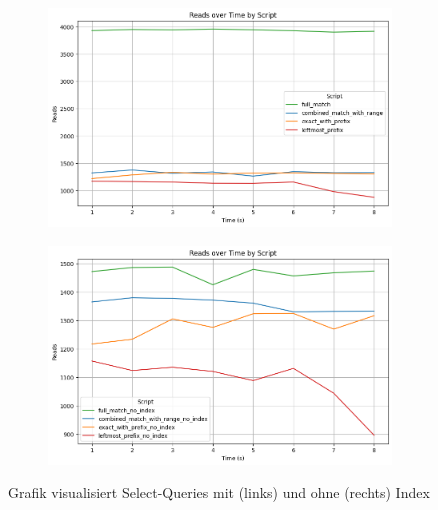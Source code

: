 \vspace{-4pt}
\begin{figure}[H]
    \centering
    \begin{subfigure}[t]{0.48\textwidth}
        \centering
        \includegraphics[width=\textwidth]{PNGs/Script/Index/Hash/hash-query-differences/Reads}
    \end{subfigure}
    \hfill
    \begin{subfigure}[t]{0.48\textwidth}
        \centering
        \includegraphics[width=\textwidth]{PNGs/Script/Index/Hash/hash-query-differences-no-index/Reads}
    \end{subfigure}
    \vspace{-8pt}
    \caption[Hash-Indexing: Unterschiedliche Abfragen mit Index und Ohne]{Grafik visualisiert Select-Queries mit (links) und ohne (rechts) Index}
    \label{fig:indexing-hash-query-reads}
\end{figure}
